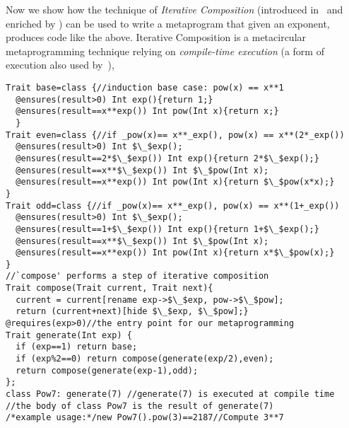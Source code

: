 Now we show how the technique of \emph{Iterative Composition} (introduced in~\cite{servetto2014meta} and
enriched by ) 
can be used to write a metaprogram that given an exponent, produces code like the above.
Iterative Composition is a metacircular metaprogramming technique relying on \emph{compile-time execution} (a form of execution also used by~\cite{sheard2002template}),
 

\vspace{-1ex}
\begin{lstlisting}
Trait base=class {//induction base case: pow(x) == x**1
  @ensures(result>0) Int exp(){return 1;}  
  @ensures(result==x**exp()) Int pow(Int x){return x;}
  }
Trait even=class {//if _pow(x)== x**_exp(), pow(x) == x**(2*_exp())
  @ensures(result>0) Int $\_$exp();
  @ensures(result==2*$\_$exp()) Int exp(){return 2*$\_$exp();}
  @ensures(result==x**$\_$exp()) Int $\_$pow(Int x);
  @ensures(result==x**exp()) Int pow(Int x){return $\_$pow(x*x);}
}
Trait odd=class {//if _pow(x)== x**_exp(), pow(x) == x**(1+_exp())
  @ensures(result>0) Int $\_$exp();
  @ensures(result==1+$\_$exp()) Int exp(){return 1+$\_$exp();}
  @ensures(result==x**$\_$exp()) Int $\_$pow(Int x);
  @ensures(result==x**exp()) Int pow(Int x){return x*$\_$pow(x);}
}
//`compose' performs a step of iterative composition
Trait compose(Trait current, Trait next){
  current = current[rename exp->$\_$exp, pow->$\_$pow];
  return (current+next)[hide $\_$exp, $\_$pow];}
@requires(exp>0)//the entry point for our metaprogramming
Trait generate(Int exp) {
  if (exp==1) return base;
  if (exp%2==0) return compose(generate(exp/2),even);
  return compose(generate(exp-1),odd);
};
class Pow7: generate(7) //generate(7) is executed at compile time
//the body of class Pow7 is the result of generate(7)
/*example usage:*/new Pow7().pow(3)==2187//Compute 3**7
\end{lstlisting}
\vspace{-1ex}